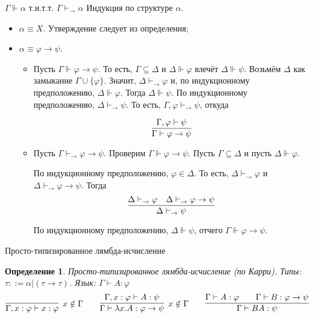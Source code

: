 \documentclass[aspectratio=169]{beamer}
\newtheorem{dfn}{Определение}[section]
\begin{document}
\begin{frame}{$\Gamma\Vdash \alpha$ т.и.т.т. $\Gamma\vdash_\rightarrow\alpha$}
Индукция по структуре $\alpha$.
\begin{itemize}
\item $\alpha \equiv X$. Утверждение следует из определения;
\item $\alpha \equiv \varphi\rightarrow\psi$. 
\begin{itemize}

\item Пусть $\Gamma\Vdash \varphi\rightarrow\psi$. То есть, $\Gamma \subseteq \Delta$ и $\Delta \Vdash \varphi$
влечёт $\Delta \Vdash \psi$.
Возьмём $\Delta$ как замыкание $\Gamma\cup\{\varphi\}$. Значит, $\Delta\vdash_\rightarrow\varphi$
 и, по индукционному предположению, $\Delta\Vdash\varphi$.
Тогда $\Delta\Vdash\psi$. По индукционному предположению, $\Delta\vdash_\rightarrow\psi$. 
То есть, $\Gamma,\varphi\vdash_\rightarrow\psi$, откуда

$$\infer{\Gamma\vdash\varphi\rightarrow\psi}{\Gamma,\varphi\vdash\psi}$$
\item Пусть $\Gamma\vdash_\rightarrow\varphi\rightarrow\psi$. Проверим $\Gamma\Vdash\varphi\rightarrow\psi$.
Пусть $\Gamma \subseteq \Delta$ и пусть $\Delta\Vdash\varphi$. 

По индукционному предположению, $\varphi\in\Delta$.
То есть, $\Delta\vdash_\rightarrow\varphi$ и $\Delta\vdash_\rightarrow\varphi\rightarrow\psi$.
Тогда $$\infer{\Delta\vdash_\rightarrow\psi}{\Delta\vdash_\rightarrow\varphi\quad\Delta\vdash_\rightarrow\varphi\rightarrow\psi}$$

По индукционному предположению, $\Delta\Vdash\psi$, отчего $\Gamma\Vdash\varphi\rightarrow\psi$.
\end{itemize}
\end{itemize}
\end{frame}

\begin{frame}{Просто-типизированное лямбда-исчисление}
\begin{dfn}
Просто-типизированное лямбда-исчисление (по Карри). \pause Типы: $\tau ::= \alpha | (\tau\rightarrow\tau)$. \pause Язык: $\Gamma\vdash A:\varphi$
$$\infer[x \notin \Gamma]{\Gamma,x:\varphi \vdash x:\varphi}{} \quad\quad 
  \infer[x \notin \Gamma]{\Gamma\vdash \lambda x.A: \varphi\rightarrow\psi}{\Gamma,x:\varphi\vdash A:\psi} \quad\quad 
  \infer{\Gamma\vdash B A:\psi}{\Gamma\vdash A:\varphi\quad\quad\Gamma\vdash B:\varphi\rightarrow\psi}$$
\end{dfn}
\end{frame}
\end{document}
